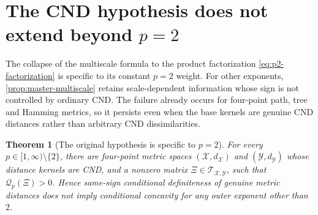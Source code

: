 \documentclass[11pt,a4paper]{article}
\newtheorem{theorem}{Theorem}[section]
\theoremstyle{definition}
\theoremstyle{remark}
\newcommand{\Tcal}{\mathcal T}
\newcommand{\Qcal}{\mathcal Q}
\begin{document}
\section{The CND hypothesis does not extend beyond \texorpdfstring{\(p=2\)}{p=2}}
\label{sec:counterexamples}

The collapse of the multiscale formula to the product factorization
\eqref{eq:p2-factorization} is specific to its constant \(p=2\) weight.  For
other exponents, \cref{prop:master-multiscale} retains scale-dependent
information whose sign is not controlled by ordinary CND.  The failure
already occurs for four-point path, tree and Hamming metrics, so it persists
even when the base kernels are genuine CND distances rather than arbitrary
CND dissimilarities.

\begin{theorem}[The original hypothesis is specific to \(p=2\)]
\label{thm:no-cnd-extension}
For every \(p\in[1,\infty)\setminus\{2\}\), there are four-point metric
spaces \((\mathcal X,d_{\mathcal X})\) and
\((\mathcal Y,d_{\mathcal Y})\) whose distance kernels are CND, and a
nonzero matrix \(\Xi\in\Tcal_{\mathcal X,\mathcal Y}\), such that
\(\Qcal_p(\Xi)>0\).  Hence same-sign conditional definiteness of genuine
metric distances does not imply conditional concavity for any outer exponent
other than \(2\).
\end{theorem}
\end{document}
